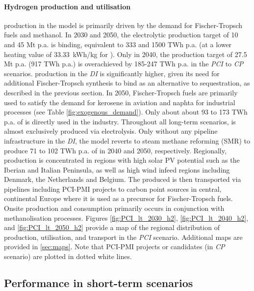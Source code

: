 \documentclass[preprint,12pt,sort&compress]{elsarticle}
\begin{document}
\paragraph{Hydrogen production and utilisation}
\label{sec:h2_production_and_utilisation}
 production in the model is primarily driven by the demand for Fischer-Tropsch fuels and methanol. In 2030 and 2050, the electrolytic  production target of 10 and 45 Mt p.a. is binding, equivalent to 333 and 1500 TWh p.a. (at a lower heating value of \SI{33.33}{kWh/kg} for ). Only in 2040, the  production target of 27.5 Mt p.a. (917 TWh p.a.) is overachieved by 185-247 TWh p.a. in the \textit{PCI} to \textit{CP} scenarios.  production in the \textit{DI} is significantly higher, given its need for additional Fischer-Tropsch synthesis to bind  as an alternative to sequestration, as described in the previous section.
In 2050, Fischer-Tropsch fuels are primarily used to satisfy the demand for kerosene in aviation and naphta for industrial processes (see Table \ref{fig:exogenous_demand}). Only about about 93 to 173 TWh p.a. of  is directly used in the industry. Throughout all long-term scenarios,  is almost exclusively produced via electrolysis. Only without any  pipeline infrastructure in the \textit{DI}, the model reverts to steam methane reforming (SMR) to produce 71 to 102 TWh p.a. of  in 2040 and 2050, respectively.
Regionally,  production is concentrated in regions with high solar PV potential such as the Iberian and Italian Peninsula, as well as high wind infeed regions including Denmark, the Netherlands and Belgium. The produced  is then transported via  pipelines including PCI-PMI projects to carbon point sources  in central, continental Europe where it is used as a precursor for Fischer-Tropsch fuels. Onsite  production and consumption primarily occurs in conjunction with methanolisation processes. Figures \ref{fig:PCI_lt_2030_h2}, \ref{fig:PCI_lt_2040_h2}, and \ref{fig:PCI_lt_2050_h2} provide a map of the regional distribution of  production, utilisation, and transport in the \textit{PCI} scenario. Additional maps are provided in \ref{sec:maps}. Note that PCI-PMI projects or candidates (in \textit{CP} scenario) are plotted in dotted white lines.


\subsection{Performance in short-term scenarios}
\label{sec:short-term_scenarios_performance}
\end{document}
